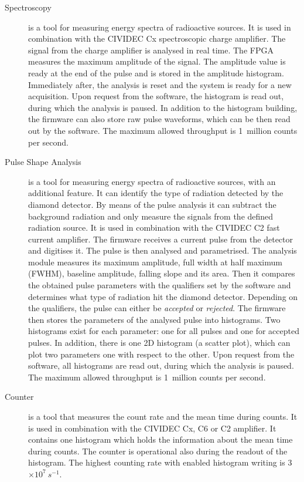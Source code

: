 \documentclass[12pt]{packages/mytustyle}  %
\begin{document}
\begin{description}
\item[Spectroscopy] is a tool for measuring energy spectra of radioactive sources. It is used in combination with the CIVIDEC Cx spectroscopic charge amplifier. The signal from the charge amplifier is analysed in real time. The FPGA measures the maximum amplitude of the signal. The amplitude value is ready at the end of the pulse and is stored in the amplitude histogram. Immediately after, the analysis is reset and the system is ready for a new acquisition. Upon request from the software, the histogram is read out, during which the analysis is paused. In addition to the histogram building, the firmware can also store raw pulse waveforms, which can be then read out by the software. The maximum allowed throughput is 1~million counts per second.

\item[Pulse Shape Analysis] is a tool for measuring energy spectra of radioactive sources, with an additional feature. It can identify the type of radiation detected by the diamond detector. By means of the pulse analysis it can subtract the background radiation and only measure the signals from the defined radiation source. It is used in combination with the CIVIDEC C2 fast current amplifier. The firmware receives a current pulse from the detector and digitises it. The pulse is then analysed and parametrised. The analysis module measures its maximum amplitude, full width at half maximum (FWHM), baseline amplitude, falling slope and its area. Then it compares the obtained pulse parameters with the qualifiers set by the software and determines what type of radiation hit the diamond detector. Depending on the qualifiers, the pulse can either be \emph{accepted} or \emph{rejected}. The firmware then stores the parameters of the analysed pulse into histograms. Two histograms exist for each parameter: one for all pulses and one for accepted pulses. In addition, there is one 2D histogram (a scatter plot), which can plot two parameters one with respect to the other. Upon request from the software, all histograms are read out, during which the analysis is paused. The maximum allowed throughput is 1~million counts per second.

\item[Counter] is a tool that measures the count rate and the mean time during counts. It is used in combination with the CIVIDEC Cx, C6 or C2 amplifier. It contains one histogram which holds the information about the mean time during counts. The counter is operational also during the readout of the histogram. The highest counting rate with enabled histogram writing is 3$\times10^7~s^{-1}$.
 
\end{description}
\end{document}
